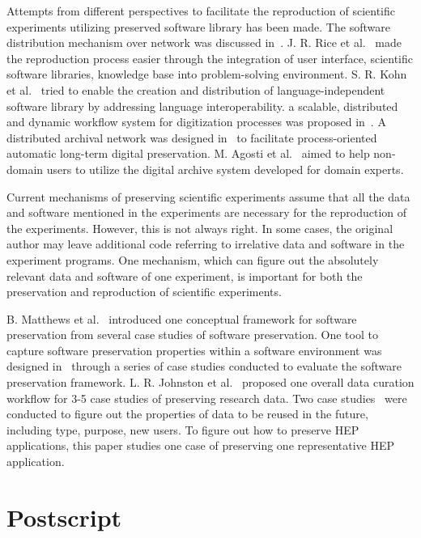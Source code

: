 \documentclass{sig-alternate}
\begin{document}
Attempts from different perspectives to facilitate the reproduction of scientific experiments utilizing preserved software library has been made. 
The software distribution mechanism over network was discussed in~\cite{compostella2010cdf, blomer2011cernvm}.
J. R. Rice et al.~\cite{rice1996scientific} made the reproduction process easier through the integration of user interface, scientific software libraries, knowledge base into problem-solving environment.
S. R. Kohn et al.~\cite{kohn2001divorcing} tried to enable the creation and distribution of language-independent software library by addressing language interoperability.
a scalable, distributed and dynamic workflow system for digitization processes was proposed in~\cite{schoneberg2013scalable}.
A distributed archival network was designed in~\cite{subotic2013distributed} to facilitate process-oriented automatic long-term digital preservation.
M. Agosti et al.~\cite{agosti2012envisage} aimed to help non-domain users to utilize the digital archive system developed for domain experts.

Current mechanisms of preserving scientific experiments assume that all the data and software mentioned in the experiments are necessary for the reproduction of the experiments. However, this is not always right. In some cases, the original author may leave additional code referring to irrelative data and software in the experiment programs. One mechanism, which can figure out the absolutely relevant data and software of one experiment, is important for both the preservation and reproduction of scientific experiments.

B. Matthews et al.~\cite{matthews2008significant} introduced one conceptual framework for software preservation from several case studies of software preservation.
One tool to capture software preservation properties within a software environment was designed in~\cite{matthews2010framework} through a series of case studies conducted to evaluate the software preservation framework.
L. R. Johnston et al.~\cite{johnston2014workflow} proposed one overall data curation workflow for 3-5 case studies of preserving research data.
Two case studies~\cite{borgman2012data} were conducted to figure out the properties of data to be reused in the future, including type, purpose, new users.
To figure out how to preserve HEP applications, this paper studies one case of preserving one representative HEP application.

\section{Postscript}
\end{document}
